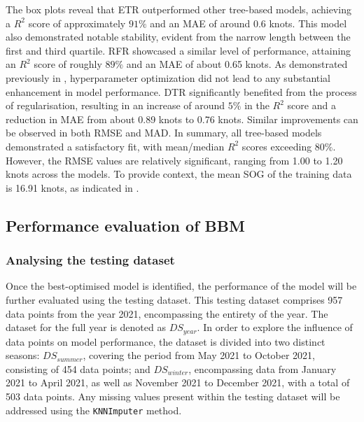 The box plots reveal that ETR outperformed other tree-based models, achieving a $R^2$ score of approximately $91\%$ and an MAE of around 0.6 knots. This model also demonstrated notable stability, evident from the narrow length between the first and third quartile. RFR showcased a similar level of performance, attaining an $R^2$ score of roughly $89\%$ and an MAE of about 0.65 knots. As demonstrated previously in , hyperparameter optimization did not lead to any substantial enhancement in model performance. DTR significantly benefited from the process of regularisation, resulting in an increase of around $5\%$ in the $R^2$ score and a reduction in MAE from about 0.89 knots to 0.76 knots. Similar improvements can be observed in both RMSE and MAD. In summary, all tree-based models demonstrated a satisfactory fit, with mean/median $R^2$ scores exceeding $80\%$. However, the RMSE values are relatively significant, ranging from 1.00 to 1.20 knots across the models. To provide context, the mean SOG of the training data is 16.91 knots, as indicated in .\\

\subsection{Performance evaluation of BBM}\label{sec:Perf_eval_BBM}

\subsubsection{Analysing the testing dataset}\label{sec:testing_data_analysis}

Once the best-optimised model is identified, the performance of the model will be further evaluated using the testing dataset. This testing dataset comprises 957 data points from the year 2021, encompassing the entirety of the year. The dataset for the full year is denoted as $DS_{year}$. In order to explore the influence of data points on model performance, the dataset is divided into two distinct seasons: $DS_{summer}$, covering the period from May 2021 to October 2021, consisting of 454 data points; and $DS_{winter}$, encompassing data from January 2021 to April 2021, as well as November 2021 to December 2021, with a total of 503 data points. Any missing values present within the testing dataset will be addressed using the {\tt KNNImputer} method.\\

